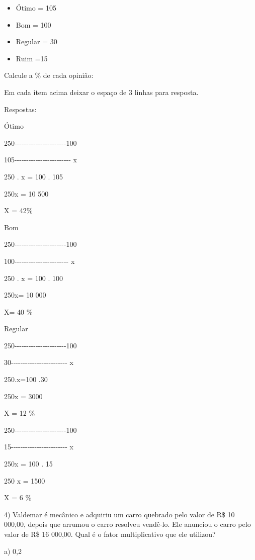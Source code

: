 {\begin{itemize}
\item
  Ótimo = 105
\item
  Bom = 100
\item
  Regular = 30
\item
  Ruim =15
\end{itemize}

Calcule a \% de cada opinião:

Em cada item acima deixar o espaço de 3 linhas para resposta.

Respostas:

Ótimo

250-\/-\/-\/-\/-\/-\/-\/-\/-\/-\/-\/-\/-\/-\/-\/-\/-\/-\/-\/-\/-\/-100

105-\/-\/-\/-\/-\/-\/-\/-\/-\/-\/-\/-\/-\/-\/-\/-\/-\/-\/-\/-\/-\/-\/-\/-
x

250 . x = 100 . 105

250x = 10 500

X = 42\%

Bom

250-\/-\/-\/-\/-\/-\/-\/-\/-\/-\/-\/-\/-\/-\/-\/-\/-\/-\/-\/-\/-\/-100

100-\/-\/-\/-\/-\/-\/-\/-\/-\/-\/-\/-\/-\/-\/-\/-\/-\/-\/-\/-\/-\/-\/- x

250 . x = 100 . 100

250x= 10 000

X= 40 \%

Regular

250-\/-\/-\/-\/-\/-\/-\/-\/-\/-\/-\/-\/-\/-\/-\/-\/-\/-\/-\/-\/-\/-100

30-\/-\/-\/-\/-\/-\/-\/-\/-\/-\/-\/-\/-\/-\/-\/-\/-\/-\/-\/-\/-\/-\/-\/-
x

250.x=100 .30

250x = 3000

X = 12 \%

250-\/-\/-\/-\/-\/-\/-\/-\/-\/-\/-\/-\/-\/-\/-\/-\/-\/-\/-\/-\/-\/-100

15-\/-\/-\/-\/-\/-\/-\/-\/-\/-\/-\/-\/-\/-\/-\/-\/-\/-\/-\/-\/-\/-\/-\/-
x

250x = 100 . 15

250 x = 1500

X = 6 \%

4) Valdemar é mecânico e adquiriu um carro quebrado pelo valor de R\$ 10
000,00, depois que arrumou o carro resolveu vendê-lo. Ele anunciou o
carro pelo valor de R\$ 16 000,00. Qual é o fator multiplicativo que ele
utilizou?

a) 0,2

}
